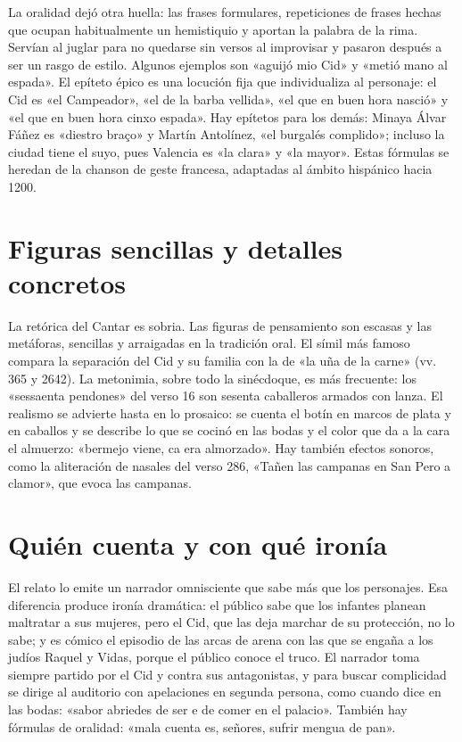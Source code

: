 \documentclass{book}
\begin{document}
La oralidad dejó otra huella: las frases formulares, repeticiones de frases hechas que ocupan habitualmente un hemistiquio y aportan la palabra de la rima. Servían al juglar para no quedarse sin versos al improvisar y pasaron después a ser un rasgo de estilo. Algunos ejemplos son «aguijó mio Cid» y «metió mano al espada». El epíteto épico es una locución fija que individualiza al personaje: el Cid es «el Campeador», «el de la barba vellida», «el que en buen hora nasció» y «el que en buen hora cinxo espada». Hay epítetos para los demás: Minaya Álvar Fáñez es «diestro braço» y Martín Antolínez, «el burgalés complido»; incluso la ciudad tiene el suyo, pues Valencia es «la clara» y «la mayor». Estas fórmulas se heredan de la chanson de geste francesa, adaptadas al ámbito hispánico hacia 1200.


\section{Figuras sencillas y detalles concretos}

La retórica del Cantar es sobria. Las figuras de pensamiento son escasas y las metáforas, sencillas y arraigadas en la tradición oral. El símil más famoso compara la separación del Cid y su familia con la de «la uña de la carne» (vv. 365 y 2642). La metonimia, sobre todo la sinécdoque, es más frecuente: los «sessaenta pendones» del verso 16 son sesenta caballeros armados con lanza. El realismo se advierte hasta en lo prosaico: se cuenta el botín en marcos de plata y en caballos y se describe lo que se cocinó en las bodas y el color que da a la cara el almuerzo: «bermejo viene, ca era almorzado». Hay también efectos sonoros, como la aliteración de nasales del verso 286, «Tañen las campanas en San Pero a clamor», que evoca las campanas.


\section{Quién cuenta y con qué ironía}

El relato lo emite un narrador omnisciente que sabe más que los personajes. Esa diferencia produce ironía dramática: el público sabe que los infantes planean maltratar a sus mujeres, pero el Cid, que las deja marchar de su protección, no lo sabe; y es cómico el episodio de las arcas de arena con las que se engaña a los judíos Raquel y Vidas, porque el público conoce el truco. El narrador toma siempre partido por el Cid y contra sus antagonistas, y para buscar complicidad se dirige al auditorio con apelaciones en segunda persona, como cuando dice en las bodas: «sabor abriedes de ser e de comer en el palacio». También hay fórmulas de oralidad: «mala cuenta es, señores, sufrir mengua de pan».
\end{document}
